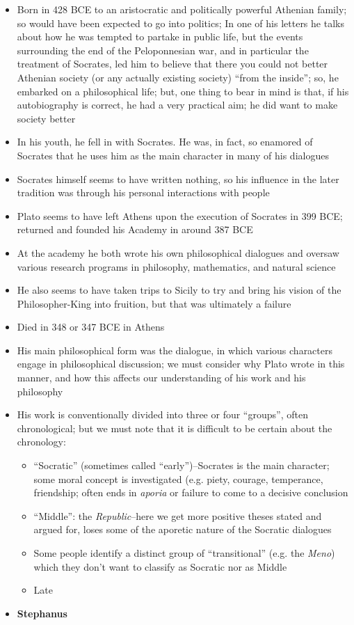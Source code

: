 \documentclass[11pt]{article}
\begin{document}
\begin{itemize}

\item{Born in 428 BCE to an aristocratic and politically powerful Athenian family; so would have been expected to go into politics; In one of his letters he talks about how he was tempted to partake in public life, but the events surrounding the end of the Peloponnesian war, and in particular the treatment of Socrates, led him to believe that there you could not better Athenian society (or any actually existing society) ``from the inside''; so, he embarked on a philosophical life; but, one thing to bear in mind is that, if his autobiography is correct, he had a very practical aim; he did want to make society better}\item{In his youth, he fell in with Socrates. He was, in fact, so enamored of Socrates that he uses him as the main character in many of his dialogues}\item{Socrates himself seems to have written nothing, so his influence in the later tradition was through his personal interactions with people}\item{Plato seems to have left Athens upon the execution of Socrates in 399 BCE; returned and founded his Academy in around 387 BCE}\item{At the academy he both wrote his own philosophical dialogues and oversaw various research programs in philosophy, mathematics, and natural science}\item{He also seems to have taken trips to Sicily to try and bring his vision of the Philosopher-King into fruition, but that was ultimately a failure}\item{Died in 348 or 347 BCE in Athens}\item{His main philosophical form was the dialogue, in which various characters engage in philosophical discussion; we must consider why Plato wrote in this manner, and how this affects our understanding of his work and his philosophy}\item{His work is conventionally divided into three or four ``groups'', often chronological; but we must note that it is difficult to be certain about the chronology:}\begin{itemize}\item{``Socratic'' (sometimes called ``early'')--Socrates is the main character; some moral concept is investigated (e.g. piety, courage, temperance, friendship; often ends in \emph{aporia} or failure to come to a decisive conclusion}\item{``Middle'': the \emph{Republic}--here we get more positive theses stated and argued for, loses some of the aporetic nature of the Socratic dialogues}\item{Some people identify a distinct group of ``transitional'' (e.g. the \emph{Meno}) which they don't want to classify as Socratic nor as Middle}\item{Late}\end{itemize}
\item{\textbf{Stephanus}}
\end{itemize}
\end{document}
